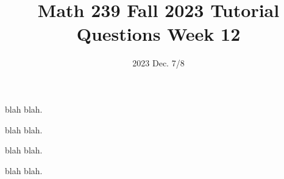 \title{Math 239 Fall 2023 Tutorial Questions Week 12}

\date{2023 Dec. 7/8}
\maketitle

\begin{enumerate}
     blah blah.

    
     blah blah.

    
     blah blah.

    
     blah blah.
\end{enumerate}